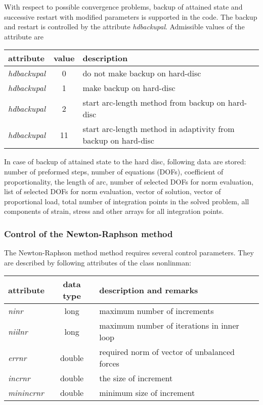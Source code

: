 With respect to possible convergence problems, backup of attained state and successive restart with modified
parameters is supported in the code. The backup and restart is controlled by
the attribute {\it hdbackupal}.
Admissible values of the attribute are

\begin{center}
\begin{tabular}{|l|c|l|}
\hline
attribute & value & description
\\ \hline \hline
{\it hdbackupal} & 0 & do not make backup on hard-disc
\\ \hline
{\it hdbackupal} & 1 & make backup on hard-disc
\\ \hline
{\it hdbackupal} & 2 & start arc-length method from backup on hard-disc
\\ \hline
{\it hdbackupal} & 11 & start arc-length method in adaptivity from backup on hard-disc
\\ \hline
\end{tabular}
\end{center}

\noindent
In case of backup of attained state to the hard disc, following data are stored: number of preformed
steps, number of equations (DOFs), coefficient of proportionality, the length of arc, number of
selected DOFs for norm evaluation, list of selected DOFs for norm evaluation, vector of solution,
vector of proportional load, total number of integration points in the solved problem, all
components of strain, stress and other arrays for all integration points.



\subsubsection{Control of the Newton-Raphson method}

The Newton-Raphson method method requires several control parameters.
They are described by following attributes of the class {\sf nonlinman}:

\begin{center}
\begin{tabular}{|l|c|l|}
\hline
attribute & data type & description and remarks
\\ \hline \hline
{\it ninr} &  {\sf long} & maximum number of increments
\\ \hline
{\it niilnr} & {\sf long} & maximum number of iterations in inner loop
\\ \hline
{\it errnr} & {\sf double} & required norm of vector of unbalanced forces
\\ \hline
{\it incrnr} & {\sf double} & the size of increment
\\ \hline
{\it minincrnr} & {\sf double} & minimum size of increment
\\ \hline
\end{tabular}
\end{center}






